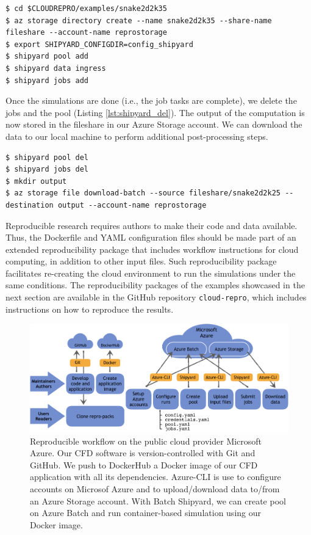 \documentclass[10pt,journal,compsoc]{IEEEtran}
\begin{document}
\begin{lstlisting}[label=lst:shipyard_run,caption={Create a pool with Batch Shipyard and submit jobs to it.}]
$ cd $CLOUDREPRO/examples/snake2d2k35
$ az storage directory create --name snake2d2k35 --share-name fileshare --account-name reprostorage
$ export SHIPYARD_CONFIGDIR=config_shipyard
$ shipyard pool add
$ shipyard data ingress
$ shipyard jobs add
\end{lstlisting}

Once the simulations are done (i.e., the job tasks are complete), we delete the jobs and the pool (Listing \ref{lst:shipyard_del}).
The output of the computation is now stored in the fileshare in our Azure Storage account.
We can download the data to our local machine to perform additional post-processing steps.

\begin{lstlisting}[label=lst:shipyard_del,caption={Delete the pool and jobs, and download to output to a local machine.}]
$ shipyard pool del
$ shipyard jobs del
$ mkdir output
$ az storage file download-batch --source fileshare/snake2d2k25 --destination output --account-name reprostorage
\end{lstlisting}

Reproducible research requires authors to make their code and data available.
Thus, the Dockerfile and YAML configuration files should be made part of an extended reproducibility package that includes workflow instructions for cloud computing, in addition to other input files.
Such reproducibility package facilitates re-creating the cloud environment to run the simulations under the same conditions.
The reproducibility packages of the examples showcased in the next section are available in the GitHub repository \texttt{cloud-repro}, which includes instructions on how to reproduce the results.

\begin{figure}[!h]
    \centering
    \includegraphics[width=16cm]{figures/cloud_workflow.png}
    \caption{Reproducible workflow on the public cloud provider Microsoft Azure. Our CFD software is version-controlled with Git and GitHub. We push to DockerHub a Docker image of our CFD application with all its dependencies. Azure-CLI is use to configure accounts on Microsof Azure and to upload/download data to/from an Azure Storage account. With Batch Shipyard, we can create pool on Azure Batch and run container-based simulation using our Docker image.}
    \label{fig:cloud_workflow}
\end{figure}
\end{document}
